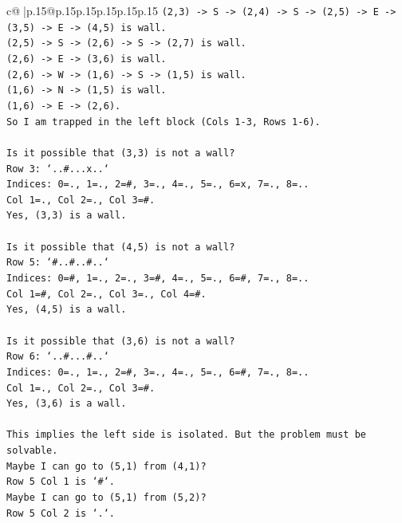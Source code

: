 \documentclass{article}
\begin{document}
{\begin{supertabular}{c@{$\;$}|p{.15\linewidth}@{}p{.15\linewidth}p{.15\linewidth}p{.15\linewidth}p{.15\linewidth}p{.15\linewidth}}
{{{\texttt{(2,3) {-}> S {-}> (2,4) {-}> S {-}> (2,5) {-}> E {-}> (3,5) {-}> E {-}> (4,5) is wall.} \\
\texttt{(2,5) {-}> S {-}> (2,6) {-}> S {-}> (2,7) is wall.} \\
\texttt{(2,6) {-}> E {-}> (3,6) is wall.} \\
\texttt{(2,6) {-}> W {-}> (1,6) {-}> S {-}> (1,5) is wall.} \\
\texttt{(1,6) {-}> N {-}> (1,5) is wall.} \\
\texttt{(1,6) {-}> E {-}> (2,6).} \\
\texttt{So I am trapped in the left block (Cols 1{-}3, Rows 1{-}6).} \\
\\ 
\texttt{Is it possible that (3,3) is not a wall?} \\
\texttt{Row 3: `..\#...x..`} \\
\texttt{Indices: 0=., 1=., 2=\#, 3=., 4=., 5=., 6=x, 7=., 8=..} \\
\texttt{Col 1=., Col 2=., Col 3=\#.} \\
\texttt{Yes, (3,3) is a wall.} \\
\\ 
\texttt{Is it possible that (4,5) is not a wall?} \\
\texttt{Row 5: `\#..\#..\#..`} \\
\texttt{Indices: 0=\#, 1=., 2=., 3=\#, 4=., 5=., 6=\#, 7=., 8=..} \\
\texttt{Col 1=\#, Col 2=., Col 3=., Col 4=\#.} \\
\texttt{Yes, (4,5) is a wall.} \\
\\ 
\texttt{Is it possible that (3,6) is not a wall?} \\
\texttt{Row 6: `..\#...\#..`} \\
\texttt{Indices: 0=., 1=., 2=\#, 3=., 4=., 5=., 6=\#, 7=., 8=..} \\
\texttt{Col 1=., Col 2=., Col 3=\#.} \\
\texttt{Yes, (3,6) is a wall.} \\
\\ 
\texttt{This implies the left side is isolated. But the problem must be solvable.} \\
\texttt{Maybe I can go to (5,1) from (4,1)?} \\
\texttt{Row 5 Col 1 is `\#`.} \\
\texttt{Maybe I can go to (5,1) from (5,2)?} \\
\texttt{Row 5 Col 2 is `.`.} \\
}}}
\end{supertabular}}
\end{document}
